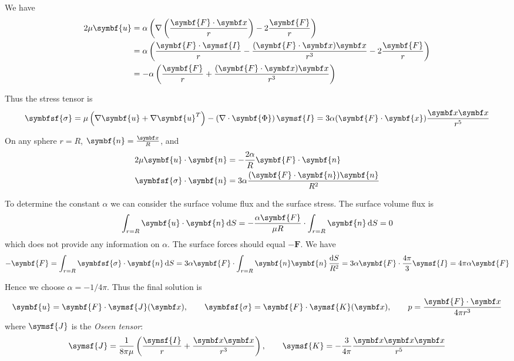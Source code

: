 \documentclass{jknotes}
\begin{document}
We have
\begin{equation}
	\begin{aligned}
		2\mu \symbf{u} &= \alpha \left( \nabla \left( \frac{\symbf{F} \cdot
			\x}{r}\right) - 2
		\frac{\symbf{F}}{r}\right) \\
		&= \alpha \left( \frac{\symbf{F} \cdot \symsf{I}}{r} -
	\frac{(\symbf{F}\cdot\x)\x}{r^3} - 2\frac{\symbf{F}}{r}\right) \\
	&= -\alpha \left( \frac{\symbf{F}}{r} + \frac{(\symbf{F}\cdot\x)\x}{r^3}\right)
\end{aligned}
\end{equation}

Thus the stress tensor is
\begin{equation}
	\symbfsf{\sigma} = \mu \left( \nabla \symbf{u} + \nabla \symbf{u}^T\right) -
	\left(\nabla \cdot \symbf{\Phi}\right)\symsf{I} = 3\alpha (\symbf{F} \cdot
	\symbf{x}) \frac{\x \x}{r^5}
\end{equation}

On any sphere $r=R$, $\symbf{n} = \frac{\x}{R}$, and
\begin{equation}
	\begin{aligned}
		2\mu \symbf{u}\cdot\symbf{n} &= -\frac{2\alpha}{R} \symbf{F}\cdot\symbf{n} \\
		\symbfsf{\sigma} \cdot \symbf{n} &= 3 \alpha \frac{(\symbf{F} \cdot
		\symbf{n}) \symbf{n}}{R^2}
	\end{aligned}
\end{equation}

To determine the constant $\alpha$ we can consider the surface volume flux and
the surface stress. The surface volume flux is
\begin{equation}
	\int_{r=R} \symbf{u}\cdot\symbf{n}\,\diffd S = -\frac{\alpha \symbf{F}}{\mu R}
	\cdot \int_{r=R} \symbf{n} \, \diffd S = 0
\end{equation}
which does not provide any information on $\alpha$. The surface forces should
equal $-\symbf{F}$. We have
\begin{equation}
	-\symbf{F} = \int_{r=R} \symbfsf{\sigma} \cdot \symbf{n} \, \diffd S = 3\alpha
	\symbf{F} \cdot \int_{r=R} \symbf{n} \symbf{n} \, \frac{\diffd S}{R^2} = 3 \alpha
	\symbf{F} \cdot \frac{4\pi}{3} \symsf{I} = 4\pi \alpha \symbf{F}
\end{equation}

Hence we choose $\alpha = -1/4\pi$. Thus the final solution is
\begin{equation}
	\symbf{u} = \symbf{F} \cdot \symsf{J}(\x), \hspace{2em} \symbfsf{\sigma} =
	\symbf{F} \cdot \symsf{K}(\x), \hspace{2em} p =
	\frac{\symbf{F}\cdot\x}{4\pi r^3}
\end{equation}
where $\symsf{J}$ is the \emph{Oseen tensor}:
\begin{equation}
	\symsf{J} = \frac{1}{8\pi \mu} \left( \frac{\symsf{I}}{r} +
		\frac{\x\x}{r^3}\right), \hspace{2em} \symsf{K} =
		-\frac{3}{4\pi} \frac{\x\x\x}{r^5}
\end{equation}
\end{document}
